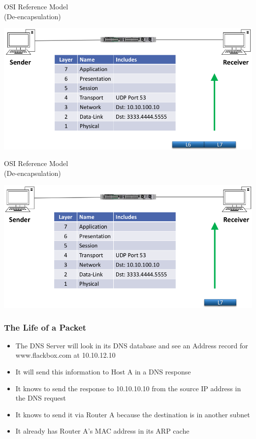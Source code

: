 \documentclass[pdflatex,compress,mathserif]{beamer}
\begin{document}
\begin{frame}{OSI Reference Model\\(De-encapsulation)}
	\begin{center}
		\includegraphics[width=\linewidth]{img/img34}
	\end{center}
\end{frame}

\begin{frame}{OSI Reference Model\\(De-encapsulation)}
	\begin{center}
		\includegraphics[width=\linewidth]{img/img35}
	\end{center}
\end{frame}

\begin{frame}
	\frametitle{The Life of a Packet}
	\begin{itemize}
		\item The DNS Server will look in its DNS database and see an Address record for www.flackbox.com at 10.10.12.10
		\item It will send this information to Host A in a DNS response
		\item It knows to send the response to 10.10.10.10 from the source IP address in the DNS request
		\item It knows to send it via Router A because the destination is in another subnet
		\item It already has Router A’s MAC address in its ARP cache
	\end{itemize}
\end{frame}
\end{document}
